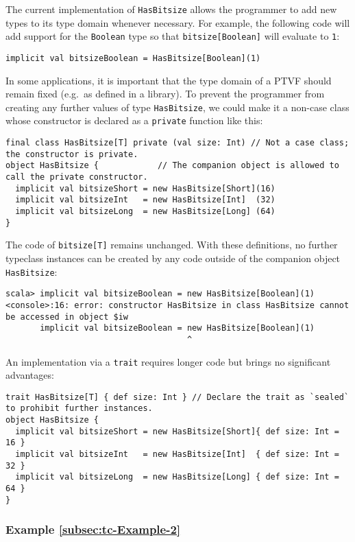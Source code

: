 The current implementation of \lstinline!HasBitsize! allows the programmer
to add new types to its type domain whenever necessary. For example,
the following code will add support for the \lstinline!Boolean! type
so that \lstinline!bitsize[Boolean]! will evaluate to \lstinline!1!:
\begin{lstlisting}
implicit val bitsizeBoolean = HasBitsize[Boolean](1)
\end{lstlisting}
In some applications, it is important that the type domain of a PTVF
should remain fixed (e.g.~as defined in a library). To prevent the
programmer from creating any further values of type \lstinline!HasBitsize!,
we could make it a non-case class whose constructor is declared as
a \lstinline!private! function like this:
\begin{lstlisting}
final class HasBitsize[T] private (val size: Int) // Not a case class; the constructor is private.
object HasBitsize {            // The companion object is allowed to call the private constructor.
  implicit val bitsizeShort = new HasBitsize[Short](16)
  implicit val bitsizeInt   = new HasBitsize[Int]  (32)
  implicit val bitsizeLong  = new HasBitsize[Long] (64)
}
\end{lstlisting}
The code of \lstinline!bitsize[T]! remains unchanged. With these
definitions, no further typeclass instances can be created by any
code outside of the companion object \lstinline!HasBitsize!:
\begin{lstlisting}
scala> implicit val bitsizeBoolean = new HasBitsize[Boolean](1)
<console>:16: error: constructor HasBitsize in class HasBitsize cannot be accessed in object $iw
       implicit val bitsizeBoolean = new HasBitsize[Boolean](1)
                                     ^
\end{lstlisting}

An implementation via a \lstinline!trait! requires longer code but
brings no significant advantages:
\begin{lstlisting}
trait HasBitsize[T] { def size: Int } // Declare the trait as `sealed` to prohibit further instances.
object HasBitsize {
  implicit val bitsizeShort = new HasBitsize[Short]{ def size: Int = 16 }
  implicit val bitsizeInt   = new HasBitsize[Int]  { def size: Int = 32 }
  implicit val bitsizeLong  = new HasBitsize[Long] { def size: Int = 64 }
}
\end{lstlisting}


\subsubsection{Example \label{subsec:tc-Example-2}\ref{subsec:tc-Example-2}}

